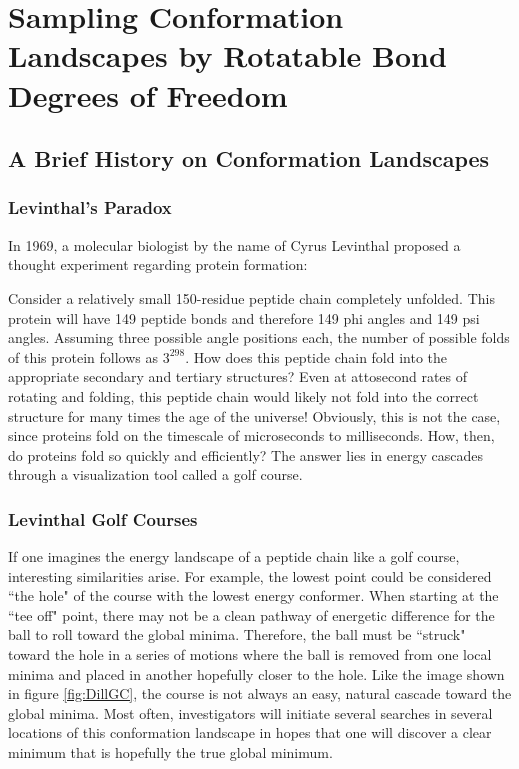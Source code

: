 \chapter{Sampling Conformation Landscapes by Rotatable Bond Degrees of Freedom}
\label{ch:ConformationLandscape}

\section{A Brief History on Conformation Landscapes}

\subsection{Levinthal's Paradox}

In 1969, a molecular biologist by the name of Cyrus Levinthal proposed a thought experiment regarding protein formation\cite{Levinthal}:

Consider a relatively small 150-residue peptide chain completely unfolded.
This protein will have 149 peptide bonds and therefore 149 phi angles and 149 psi angles. 
Assuming three possible angle positions each, the number of possible folds of this protein follows as $3^{298}$.
How does this peptide chain fold into the appropriate secondary and tertiary structures? 
Even at attosecond rates of rotating and folding, this peptide chain would likely not fold into the correct structure for many times the age of the universe!
Obviously, this is not the case, since proteins fold on the timescale of microseconds to milliseconds.\cite{LevParadoxCalculated}
How, then, do proteins fold so quickly and efficiently?
The answer lies in energy cascades through a visualization tool called a golf course.

\subsection{Levinthal Golf Courses}

If one imagines the energy landscape of a peptide chain like a golf course, interesting similarities arise.
For example, the lowest point could be considered ``the hole" of the course with the lowest energy conformer. 
When starting at the ``tee off" point, there may not be a clean pathway of energetic difference for the ball to roll toward the global minima.
Therefore, the ball must be ``struck" toward the hole in a series of motions where the ball is removed from one local minima and placed in another hopefully closer to the hole. 
Like the image shown in figure \ref{fig:DillGC}, the course is not always an easy, natural cascade toward the global minima.
Most often, investigators will initiate several searches in several locations of this conformation landscape in hopes that one will discover a clear minimum that is hopefully the true global minimum.

